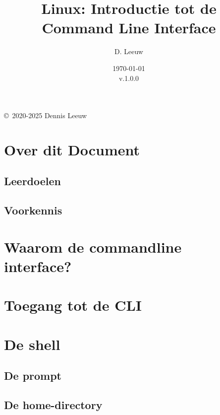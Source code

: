 \documentclass[a4paper,12pt,twoside,openright,titlepage]{book}
\author{D. Leeuw}
\title{Linux: Introductie tot de Command Line Interface}
\date{\today\\v.1.0.0}
\begin{document}

\maketitle

\copyright\ 2020-2025 Dennis Leeuw\\




\frontmatter
\chapter{Over dit Document}
\section{Leerdoelen}

\section{Voorkennis}

%
%

\tableofcontents

\mainmatter

\chapter{Waarom de commandline interface?}

\chapter{Toegang tot de CLI}

\chapter{De shell}

\section{De prompt}

\section{De home-directory}

\end{document}
